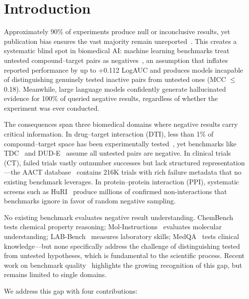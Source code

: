 \section{Introduction}
\label{sec:introduction}

Approximately 90\% of experiments produce null or inconclusive results, yet publication bias ensures the vast majority remain unreported~\citep{fanelli2012negative,mlinaric2017dealing}. This creates a systematic blind spot in biomedical AI: machine learning benchmarks treat untested compound--target pairs as negatives~\citep{huang2021therapeutics,mysinger2012dude}, an assumption that inflates reported performance by up to +0.112 LogAUC and produces models incapable of distinguishing genuinely tested inactive pairs from untested ones (MCC $\leq$ 0.18). Meanwhile, large language models confidently generate hallucinated evidence for 100\% of queried negative results, regardless of whether the experiment was ever conducted.

The consequences span three biomedical domains where negative results carry critical information. In drug--target interaction (DTI), less than 1\% of compound--target space has been experimentally tested~\citep{gaulton2017chembl}, yet benchmarks like TDC~\citep{huang2021therapeutics} and DUD-E~\citep{mysinger2012dude} assume all untested pairs are negative. In clinical trials (CT), failed trials vastly outnumber successes but lack structured representation---the AACT database~\citep{tasneem2012aact} contains 216K trials with rich failure metadata that no existing benchmark leverages. In protein--protein interaction (PPI), systematic screens such as HuRI~\citep{luck2020huri} produce millions of confirmed non-interactions that benchmarks ignore in favor of random negative sampling.

No existing benchmark evaluates negative result understanding. ChemBench~\citep{mirza2025chembench} tests chemical property reasoning; Mol-Instructions~\citep{fang2024molinstructions} evaluates molecular understanding; LAB-Bench~\citep{laurent2024labbench} measures laboratory skills; MedQA~\citep{jin2021medqa} tests clinical knowledge---but none specifically address the challenge of distinguishing tested from untested hypotheses, which is fundamental to the scientific process. Recent work on benchmark quality~\citep{liu2024welqrate,tran2020litpcba} highlights the growing recognition of this gap, but remains limited to single domains.

We address this gap with four contributions:

